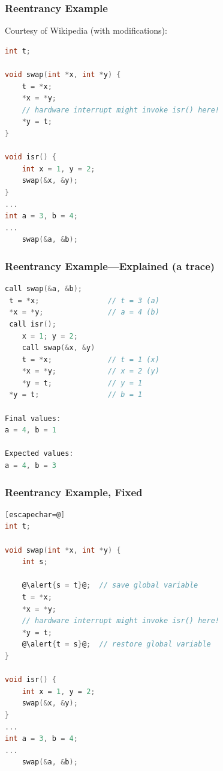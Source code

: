 \begin{frame}[fragile]
  \frametitle{Reentrancy Example}

  

  Courtesy of Wikipedia (with modifications):
  \begin{lstlisting}[language=C]
int t;
 
void swap(int *x, int *y) {
    t = *x;
    *x = *y;
    // hardware interrupt might invoke isr() here!
    *y = t;
}
 
void isr() {
    int x = 1, y = 2;
    swap(&x, &y);
}
...
int a = 3, b = 4;
...
    swap(&a, &b);
  \end{lstlisting}
  
\end{frame}

\begin{frame}[fragile]
  \frametitle{Reentrancy Example---Explained (a trace)}

  
  \begin{lstlisting}[language=C]
call swap(&a, &b);
 t = *x;                // t = 3 (a)
 *x = *y;               // a = 4 (b)
 call isr();
    x = 1; y = 2;
    call swap(&x, &y)
    t = *x;             // t = 1 (x)
    *x = *y;            // x = 2 (y)
    *y = t;             // y = 1
 *y = t;                // b = 1

Final values:
a = 4, b = 1

Expected values:
a = 4, b = 3
  \end{lstlisting}
  
\end{frame}

\begin{frame}[fragile]
  \frametitle{Reentrancy Example, Fixed}

  
  \begin{lstlisting}[language=C][escapechar=@]
int t;
 
void swap(int *x, int *y) {
    int s;
 
    @\alert{s = t}@;  // save global variable
    t = *x;
    *x = *y;
    // hardware interrupt might invoke isr() here!
    *y = t;
    @\alert{t = s}@;  // restore global variable
}
 
void isr() {
    int x = 1, y = 2;
    swap(&x, &y);
}
...
int a = 3, b = 4;
...
    swap(&a, &b);
  \end{lstlisting}
  
\end{frame}

